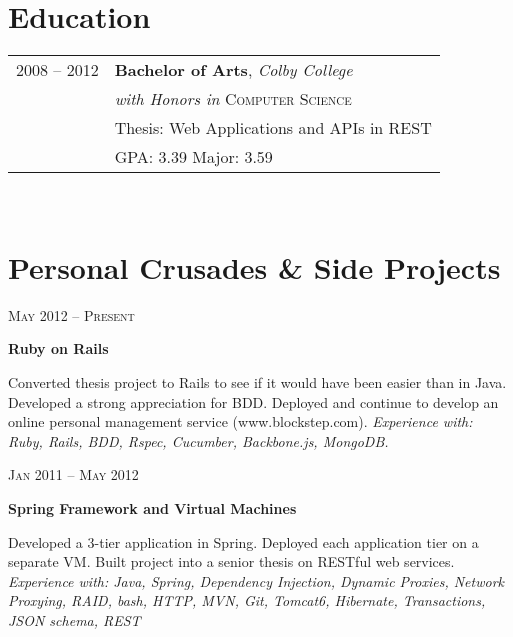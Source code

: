 \documentclass[10pt]{article} %
\begin{document}
{\begin{minipage}[t]{0.44\textwidth}

\section{Education} 


\begin{tabular}{rl} %


2008 -- \textsc{2012} & \textbf{Bachelor of Arts}, \textit{Colby College}\\ 
											& \textit{with Honors in} \textsc{Computer Science} \\
											& \footnotesize Thesis: Web Applications and APIs in REST \\
											& \small{GPA: 3.39} \small{Major: 3.59} \\
\end{tabular}\\

\section{Personal Crusades \& Side Projects}


{\raggedleft\textsc{May 2012 -- Present}\par}
{\raggedright\large \textbf{Ruby on Rails}}
{\normalsize{ Converted thesis project to Rails to see if it would have been easier than in Java. Developed a strong appreciation for BDD. Deployed and continue to develop an online personal management service (www.blockstep.com).}
\textit{Experience with: Ruby, Rails, BDD, Rspec, Cucumber, Backbone.js, MongoDB. }}


{\raggedleft\textsc{Jan 2011 -- May 2012}\par}
{\raggedright\large \textbf{Spring Framework and Virtual Machines} }
{\normalsize{ Developed a 3-tier application in Spring. Deployed each application tier on a separate VM. Built project into a senior thesis on RESTful web services. }
\textit{Experience with: Java, Spring, Dependency Injection, Dynamic Proxies, Network Proxying, RAID, bash, HTTP, MVN, Git, Tomcat6, Hibernate, Transactions, JSON schema, REST } }


\end{minipage}}
\end{document}
